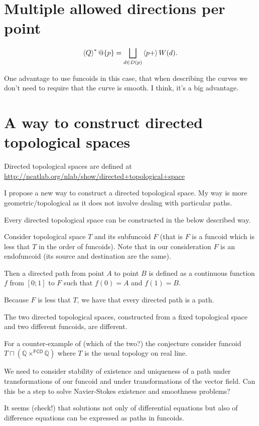 \section{Multiple allowed directions per point}

\[ \left\langle Q\right\rangle ^{\ast}@\{p\} = \bigsqcup_{d\in D(p)} \left\langle p+\right\rangle W(d). \]

One advantage to use funcoids in this case, that when describing the curves we don't need to require that the curve is smooth. I think, it's a big advantage.

\section{A way to construct directed topological spaces}


Directed topological spaces are defined at\\
\url{http://ncatlab.org/nlab/show/directed+topological+space}

I propose a new way to construct a directed topological space. My way is more geometric/topological as it does not involve dealing with particular paths.

\begin{conjecture}
Every directed topological space can be constructed in the below described way.
\end{conjecture}

Consider topological space $T$ and its subfuncoid $F$ (that is $F$ is a funcoid which is less that $T$ in the order of funcoids).
Note that in our consideration $F$ is an endofuncoid (its source and destination are the same).

Then a directed path from point $A$ to point $B$ is defined as a continuous function $f$ from $[0;1]$ to $F$ such that $f(0)=A$ and $f(1)=B$.

Because $F$ is less that $T$, we have that every directed path is a path.

\begin{conjecture}
The two directed topological spaces, constructed from a fixed topological space and two different funcoids,
are different.
\end{conjecture}

For a counter-example of (which of the two?) the conjecture consider funcoid $T\sqcap(\mathbb{Q}\times^{\mathsf{FCD}}\mathbb{Q})$
where $T$ is the usual topology on real line.

We need to consider stability of existence and uniqueness of a path under transformations of our funcoid and
under transformations of the vector field. Can this be a step to solve Navier-Stokes existence and smoothness problems?

It seems (check!) that solutions not only of differential equations but also of difference equations can be
expressed as paths in funcoids.